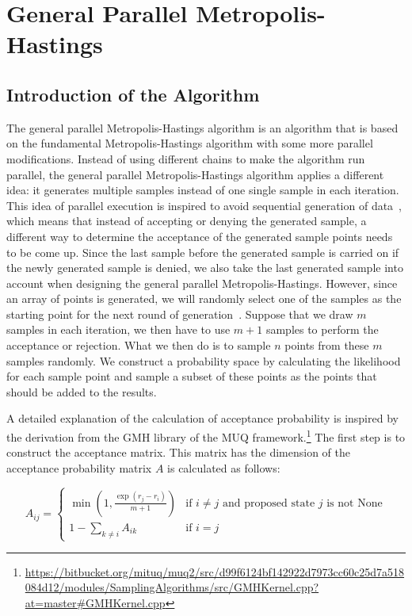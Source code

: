 \chapter{General Parallel Metropolis-Hastings}

\section{Introduction of the Algorithm}
The general parallel Metropolis-Hastings algorithm is an algorithm that is based on the fundamental Metropolis-Hastings algorithm with some more parallel modifications. Instead of using different chains to make the algorithm run parallel, the general parallel Metropolis-Hastings algorithm applies a different idea: it generates multiple samples instead of one single sample in each iteration. This idea of parallel execution is inspired to avoid sequential generation of data~\cite{gpmh_broshure}, which means that instead of accepting or denying the generated sample, a different way to determine the acceptance of the generated sample points needs to be come up. Since the last sample before the generated sample is carried on if the newly generated sample is denied, we also take the last generated sample into account when designing the general parallel Metropolis-Hastings. However, since an array of points is generated, we will randomly select one of the samples as the starting point for the next round of generation~\cite{gpmh_derivation}. Suppose that we draw $m$ samples in each iteration, we then have to use $m + 1$ samples to perform the acceptance or rejection. What we then do is to sample $n$ points from these $m$ samples randomly. We construct a probability space by calculating the likelihood for each sample point and sample a subset of these points as the points that should be added to the results.

A detailed explanation of the calculation of acceptance probability is inspired by the derivation from the GMH library of the MUQ framework.\footnote{\url{https://bitbucket.org/mituq/muq2/src/d99f6124bf142922d7973cc60c25d7a518084d12/modules/SamplingAlgorithms/src/GMHKernel.cpp?at=master#GMHKernel.cpp}} The first step is to construct the acceptance matrix. This matrix has the dimension of the acceptance probability matrix \( A \) is calculated as follows:

\begin{equation}
A_{ij} = 
\begin{cases} 
\min\left(1, \frac{\exp(r_j - r_i)}{m + 1}\right) & \text{if } i \neq j \text{ and } \text{proposed state } j \text{ is not None} \\
1-\sum_{k \neq i} A_{ik} & \text{if } i = j
\end{cases}
\end{equation}

